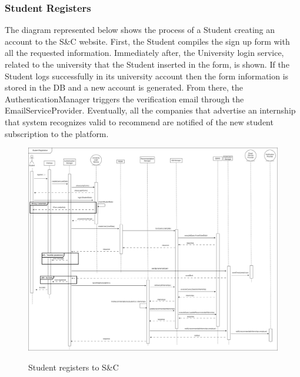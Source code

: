 \documentclass[a4paper,12pt]{article}
\begin{document}
\subsubsection*{Student Registers}
The diagram represented below shows the process of a Student creating an account to the S\&C website. First, the Student compiles the sign up form with all the requested information. Immediately after, the University login service, related to the university that the Student inserted in the form, is shown. If the Student logs successfully in its university account then the form information is stored in the DB and a new account is generated. From there, the AuthenticationManager triggers the verification email through the EmailServiceProvider. Eventually, all the companies that advertise an internship that system recognizes valid to recommend are notified of the new student subscription to the platform.
\begin{figure}[H]
\centering
\includegraphics[scale = 0.28]{DD_figures/RuntimeView/StudentRegistrationRV.drawio.png}\\
\caption{Student registers to S\&C}
\end{figure}
\end{document}
